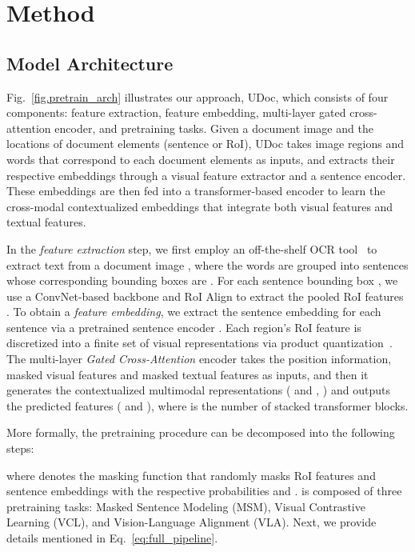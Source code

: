 \documentclass{article}
\begin{document}
	\section{Method}
	\subsection{Model Architecture}
	Fig.~\ref{fig.pretrain_arch} {illustrates} {our} {approach, UDoc, which} consists of four {components}: feature extraction, feature embedding, multi-layer gated cross-attention encoder, and pretraining tasks. Given a document image {and the locations of document elements (sentence or RoI)}, UDoc takes {image regions} and words that correspond to each document elements as {inputs,} 
	and {extracts} their respective embeddings through a visual feature extractor and a sentence encoder. These embeddings are then fed into a transformer-based encoder to learn the cross-modal contextualized embeddings that integrate both visual features and textual features.
	
	In the \textit{feature extraction} step, we first employ an off-the-shelf OCR tool~\cite{easyocr} to extract text from a document image , where the words are grouped into sentences  whose corresponding bounding boxes are . For each sentence bounding box , we use a ConvNet-based backbone  and RoI Align \cite{he2017mask}  to extract the pooled RoI features .
	To obtain a \textit{feature embedding}, we extract the sentence embedding  for each sentence  via a pretrained sentence encoder . Each region's RoI feature  is discretized into a finite set of visual representations  via product quantization~\cite{jegou2010product}. The multi-layer \textit{Gated Cross-Attention} encoder takes the position information, masked visual features  and masked textual features  as inputs, and then {it} generates the contextualized multimodal representations {( and , )} {and outputs the predicted features ( and )}, where  is the number of stacked {transformer} blocks.
	
	More formally, the pretraining procedure can be decomposed into the following steps:
	
	where  denotes the masking function that randomly mask{s} RoI features and sentence embeddings with {the respective} probabilities  and .
	{ is composed of  three pretraining tasks: {Masked Sentence Modeling (MSM), Visual Contrastive Learning (VCL), and Vision-Language Alignment (VLA)}.}
	{Next, we provide details mentioned in Eq.~\ref{eq:full_pipeline}.}
	
\end{document}
